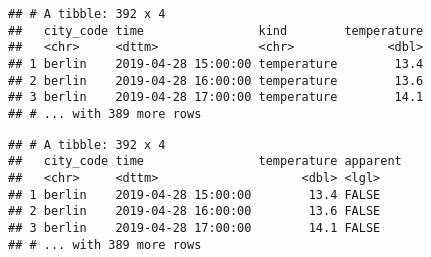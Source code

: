 \documentclass[]{book}
\newenvironment{Shaded}{\begin{snugshade}}{\end{snugshade}}
\newcommand{\DataTypeTok}[1]{\textcolor[rgb]{0.13,0.29,0.53}{#1}}
\newcommand{\KeywordTok}[1]{\textcolor[rgb]{0.13,0.29,0.53}{\textbf{#1}}}
\newcommand{\NormalTok}[1]{#1}
\newcommand{\OperatorTok}[1]{\textcolor[rgb]{0.81,0.36,0.00}{\textbf{#1}}}
\newcommand{\StringTok}[1]{\textcolor[rgb]{0.31,0.60,0.02}{#1}}
\begin{document}
\begin{Shaded}
\end{Shaded}

\begin{verbatim}
## # A tibble: 392 x 4
##   city_code time                kind        temperature
##   <chr>     <dttm>              <chr>             <dbl>
## 1 berlin    2019-04-28 15:00:00 temperature        13.4
## 2 berlin    2019-04-28 16:00:00 temperature        13.6
## 3 berlin    2019-04-28 17:00:00 temperature        14.1
## # ... with 389 more rows
\end{verbatim}

\begin{Shaded}
\end{Shaded}

\begin{verbatim}
## # A tibble: 392 x 4
##   city_code time                temperature apparent
##   <chr>     <dttm>                    <dbl> <lgl>   
## 1 berlin    2019-04-28 15:00:00        13.4 FALSE   
## 2 berlin    2019-04-28 16:00:00        13.6 FALSE   
## 3 berlin    2019-04-28 17:00:00        14.1 FALSE   
## # ... with 389 more rows
\end{verbatim}
\end{document}

